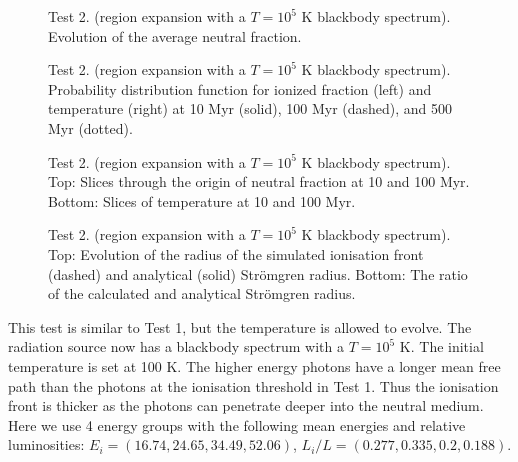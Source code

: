 \documentclass[useAMS,usenatbib]{mn2e}
\begin{document}
\begin{figure}
  \caption{\label{fig:test2_1b} Test 2. (\hii region expansion with a
    $T=10^5$ K blackbody spectrum).  Evolution of the average neutral
    fraction.}
\end{figure}

\begin{figure}
  \caption{\label{fig:test2_pdf} Test 2. (\hii region expansion with a
    $T=10^5$ K blackbody spectrum).  Probability distribution function
    for ionized fraction (left) and temperature (right) at 10 Myr
    (solid), 100 Myr (dashed), and 500 Myr (dotted).}
\end{figure}

\begin{figure*}
  \caption{\label{fig:test2_2} Test 2. (\hii region expansion
    with a $T=10^5$ K blackbody spectrum).  Top: Slices through the
    origin of neutral fraction at 10 and 100 Myr.  Bottom: Slices of
    temperature at 10 and 100 Myr.}
\end{figure*}

\begin{figure}
  \caption{\label{fig:test2_3} Test 2. (\hii region expansion
    with a $T=10^5$ K blackbody spectrum).  Top: Evolution of the
    radius of the simulated ionisation front (dashed) and analytical
    (solid) Str\"{o}mgren radius.  Bottom: The ratio of the calculated
    and analytical Str\"{o}mgren radius.}
\end{figure}

This test is similar to Test 1, but the temperature is allowed to
evolve.  The radiation source now has a blackbody spectrum with a $T =
10^5$ K.  The initial temperature is set at 100 K.  The higher energy
photons have a longer mean free path than the photons at the
ionisation threshold in Test 1.  Thus the ionisation front is thicker
as the photons can penetrate deeper into the neutral medium.  Here we
use 4 energy groups with the following mean energies and relative
luminosities: $E_i = (16.74, 24.65, 34.49, 52.06)$, $L_i/L = (0.277,
0.335, 0.2, 0.188)$.
\end{document}
